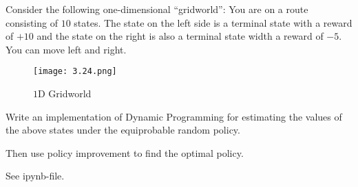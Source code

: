 \begin{exercise}
Consider the following one-dimensional \enquote{gridworld}:
You are on a route consisting of $10$ states.
The state on the left side is a terminal state with a reward of $+10$ and the state on the right is also a terminal state width a reward of $-5$.
You can move left and right.

\begin{figure}[H]
    \centering
    \texttt{[image: 3.24.png]}
    \caption{$1$D Gridworld}
    \label{fig:3.24}
\end{figure}

Write an implementation of Dynamic Programming for estimating the values of the above states under the equiprobable random policy.

Then use policy improvement to find the optimal policy.
\end{exercise}

\begin{solution}
  See ipynb-file.
\end{solution}
